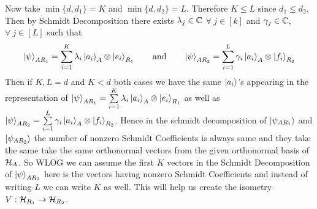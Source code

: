 \documentclass[a4paper, 11pt]{article}
\begin{document}
{\parinn

Now take $\min\{d,d_1\}=K$ and $\min\{d,d_2\}=L$. Therefore $K\leq L$ since $d_1\leq d_2$. Then by Schmidt Decomposition there exists $\lambda_j\in \mathbb{C}$ $\forall\ j\in[k]$ and $\gamma_j\in\mathbb{C}$, $\forall\ j\in [L]$ such that $$\ket{\psi}_{AR_1}=\sum_{i=1}^K\lambda_i\ket{a_i}_A\otimes \ket{e_i}_{R_1}\qquad\text{and}\qquad  \ket{\psi}_{AR_2}=\sum_{i=1}^L\gamma_i\ket{a_i}_A\otimes \ket{f_i}_{R_2}$$Then if $K,L=d$ and $K<d$ both cases we have the same $\ket{a_i}$'s appearing in the representation of $\ket{\psi}_{AR_1}=\sum\limits_{i=1}^K\lambda_i\ket{a_i}_A\otimes \ket{e_i}_{R_1}$ as well as $\ket{\psi}_{AR_2}=\sum\limits_{i=1}^L\gamma_i\ket{a_i}_A\otimes \ket{f_i}_{R_2}$. Hence in the schmidt decomposition of $\ket{\psi_{AR_1}}$ and $\ket{\psi_{AR_2}}$ the number of nonzero Schmidt Coefficients is always same and they take the same take the same orthonormal vectors from the given orthonormal basis of $\mathcal{H}_A$. So WLOG we can assume the first $K$ vectors in the Schmidt Decomposition of $\ket{\psi}_{AR_2}$ here is the vectors having nonzero Schmidt Coefficients and instead of writing $L$ we can write $K$ as well. This will help us create the isometry $V:\mathcal{H}_{R_1}\to \mathcal{H}_{R_2}$.

}
\end{document}
